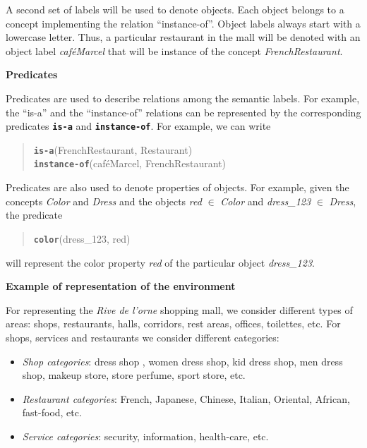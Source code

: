 A second set of labels will be used to denote objects. Each object belongs to a concept implementing the relation ``instance-of''. Object labels always start with a lowercase letter.
Thus, a particular restaurant in the mall will be denoted with an object label \emph{caf\'eMarcel} that will be instance of the concept \emph{FrenchRestaurant}. 

\vspace{1em}

\noindent 
\textbf{Predicates}

Predicates are used to describe relations among the semantic labels. For example, the ``is-a'' and the ``instance-of'' relations can be represented by the corresponding predicates {\tt\bf is-a} and {\tt\bf instance-of}. For example, we can write

\begin{quote}
{\tt\bf is-a}(FrenchRestaurant, Restaurant)\\
{\tt\bf instance-of}(caf\'eMarcel, FrenchRestaurant)\\
\end{quote}



Predicates are also used to denote properties of objects. For example, given the concepts \emph{Color} and \emph{Dress} and the objects \emph{red} $\in$ \emph{Color} and \emph{dress\_123} $\in$ \emph{Dress}, the predicate 

\begin{quote}
{\tt\bf color}(dress\_123,  red)
\end{quote}

\noindent
will represent the color property \emph{red} of the particular object  \emph{dress\_123}.


\vspace{1em}

\noindent 
\textbf{Example of representation of the environment}

For representing the \emph{Rive de l'orne} shopping mall, we consider different types of areas: shops, restaurants, halls, corridors, rest areas, offices, toilettes, etc. For shops, services and restaurants we consider different categories:
\begin{itemize}
\item {\it Shop categories}: dress shop , women dress shop, kid dress shop, men dress shop, makeup store, store perfume, sport store, etc.
\item {\it Restaurant categories}: French, Japanese, Chinese, Italian, Oriental, African, fast-food, etc.
\item {\it Service categories}: security, information, health-care, etc.
\end{itemize}

